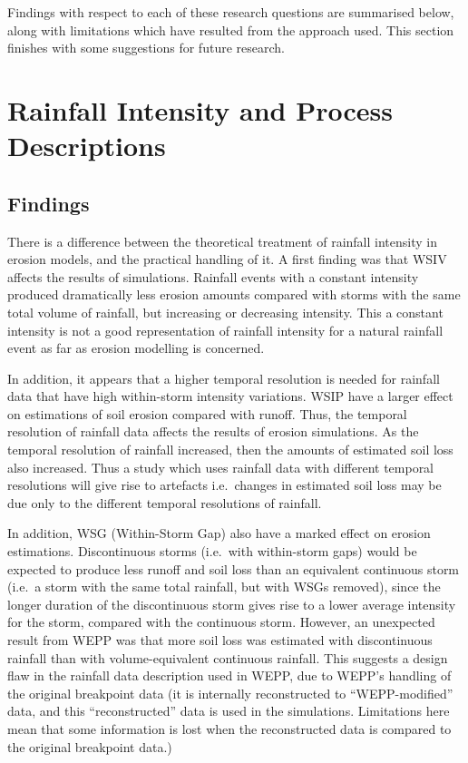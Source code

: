 Findings with respect to each of these research questions are summarised below,
along with limitations which have resulted from the approach used. This section
finishes with some suggestions for future research.

\section{Rainfall Intensity and Process Descriptions}
\label{sec:RainfallIntensityAndProcessDescriptions}
\subsection{Findings}
\label{sec:FindingsStage1}

There is a difference between the theoretical treatment of rainfall
intensity in erosion models, and the practical handling of it.
A first finding was that WSIV affects the results of simulations. Rainfall
events with a constant intensity produced dramatically less erosion amounts
compared with storms with the same total volume of rainfall, but increasing or
decreasing intensity. This a constant intensity is not a good representation of
rainfall intensity for a natural rainfall event as far as erosion modelling is
concerned.

In addition, it appears that a higher temporal resolution is needed for rainfall
data that have high within-storm intensity variations. WSIP have a larger effect
on estimations of soil erosion compared with runoff. Thus, the temporal
resolution of rainfall data affects the results of erosion simulations. As the
temporal resolution of rainfall increased, then the amounts of estimated soil
loss also increased. Thus a study which uses rainfall data with different
temporal resolutions will give rise to artefacts i.e.\ changes in estimated soil
loss may be due only to the different temporal resolutions of rainfall.

In addition, WSG (Within-Storm Gap) also have a marked effect on erosion
estimations. Discontinuous storms (i.e.\ with within-storm gaps) would be
expected to produce less runoff and soil loss than an equivalent continuous
storm (i.e.\ a storm with the same total rainfall, but with WSGs removed), since
the longer duration of the discontinuous storm gives rise to a lower average
intensity for the storm, compared with the continuous storm.
However, an unexpected result from WEPP was that more soil loss was estimated
with discontinuous rainfall than with volume-equivalent continuous rainfall.
This suggests a design flaw in the rainfall data description used in WEPP, due
to WEPP's handling of the  original breakpoint data (it is internally
reconstructed to ``WEPP-modified'' data, and this ``reconstructed'' data is
used in the simulations. Limitations here mean that some information is lost
when the reconstructed data is compared to the original breakpoint data.)


